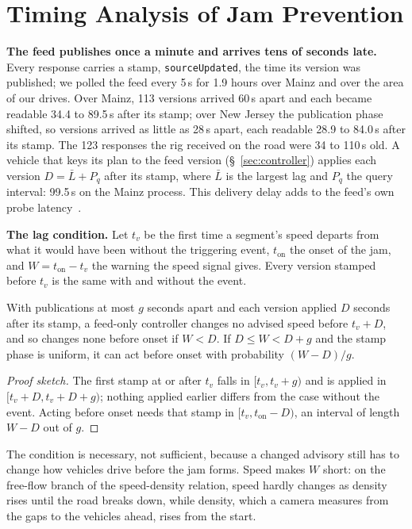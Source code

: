 \section{Timing Analysis of Jam Prevention}
\label{sec:feed}

\noindent\textbf{The feed publishes once a minute and arrives tens of seconds late.} Every response carries a stamp, \texttt{sourceUpdated}, the time its version was published; we polled the feed every 5\,s for 1.9 hours over Mainz and over the area of our drives. Over Mainz, 113 versions arrived 60\,s apart and each became readable 34.4 to 89.5\,s after its stamp; over New Jersey the publication phase shifted, so versions arrived as little as 28\,s apart, each readable 28.9 to 84.0\,s after its stamp. The 123 responses the rig received on the road were 34 to 110\,s old. A vehicle that keys its plan to the feed version (\S~\ref{sec:controller}) applies each version $D=\bar L+P_q$ after its stamp, where $\bar L$ is the largest lag and $P_q$ the query interval: 99.5\,s on the Mainz process. This delivery delay adds to the feed's own probe latency~\cite{wang2018latency}.

\noindent\textbf{The lag condition.} Let $t_v$ be the first time a segment's speed departs from what it would have been without the triggering event, $t_{\mathrm{on}}$ the onset of the jam, and $W=t_{\mathrm{on}}-t_v$ the warning the speed signal gives. Every version stamped before $t_v$ is the same with and without the event.

\begin{proposition}\label{prop:lag}
With publications at most $g$ seconds apart and each version applied $D$ seconds after its stamp, a feed-only controller changes no advised speed before $t_v+D$, and so changes none before onset if $W<D$. If $D\le W<D+g$ and the stamp phase is uniform, it can act before onset with probability $(W-D)/g$.
\end{proposition}

\begin{proof}[Proof sketch]
The first stamp at or after $t_v$ falls in $[t_v,t_v+g)$ and is applied in $[t_v+D,t_v+D+g)$; nothing applied earlier differs from the case without the event. Acting before onset needs that stamp in $[t_v,t_{\mathrm{on}}-D)$, an interval of length $W-D$ out of $g$.
\end{proof}

The condition is necessary, not sufficient, because a changed advisory still has to change how vehicles drive before the jam forms. Speed makes $W$ short: on the free-flow branch of the speed-density relation, speed hardly changes as density rises until the road breaks down, while density, which a camera measures from the gaps to the vehicles ahead, rises from the start.

